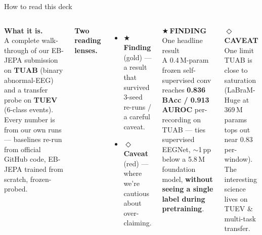 \documentclass[aspectratio=169,11pt]{beamer}
\newcommand{\caveattag}{\textcolor{tplred}{\scriptsize\sffamily\bfseries$\Diamond$\,CAVEAT}\xspace}
\newcommand{\findingtag}{\textcolor{tplgold}{\scriptsize\sffamily\bfseries$\bigstar$\,FINDING}\xspace}
\newcommand{\sectionheader}[1]{\renewcommand{\insertsection}{#1}}
\begin{document}
\sectionheader{BEFORE WE START}
\begin{frame}{How to read this deck}
\begin{columns}[T,onlytextwidth]
\textbf{What it is.}\\
A complete walk-through of our EB-JEPA submission on \textbf{TUAB} (binary
abnormal-EEG) and a transfer probe on \textbf{TUEV} (6-class events). Every number
is from our own runs --- baselines re-run from official GitHub code, EB-JEPA
trained from scratch, frozen-probed.

\vspace{0.5em}
\textbf{Two reading lenses.}
\begin{itemize}\setlength\itemsep{0pt}
  \item $\bigstar$ \textbf{Finding} (gold) --- a result that survived 3-seed re-runs / a careful caveat.
  \item $\Diamond$ \textbf{Caveat} (red) --- where we're cautious about over-claiming.
\end{itemize}

\begin{findingbox}\findingtag One headline result\\[0.2em]
\small A 0.4\,M-param frozen self-supervised conv reaches \textbf{0.836 BAcc / 0.913 AUROC}
per-recording on TUAB --- ties supervised EEGNet, $\sim$1\,pp below a 5.8\,M foundation model,
\textbf{without seeing a single label during pretraining}.
\end{findingbox}
\vspace{0.5em}
\begin{caveatbox}\caveattag One limit\\[0.2em]
\small TUAB is close to saturation (LaBraM-Huge at 369\,M params tops out near 0.83
per-window). The interesting science lives on TUEV \& multi-task transfer.
\end{caveatbox}
\end{columns}
\end{frame}
\end{document}
